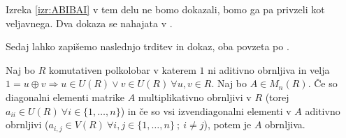 \documentclass[mat1]{fmfdelo}
\begin{document}
Izreka \ref{izr:ABIBAI} v tem delu ne bomo dokazali, bomo ga pa privzeli kot veljavnega. Dva dokaza se nahajata v \cite[poglavje 3 in poglavje 4]{bib:Reutenauer}.

Sedaj lahko zapišemo naslednjo trditev in dokaz, oba povzeta po \cite[lema 2.\ 3.]{bib:Tanbase}.

\begin{trditev}\label{trd:obrnljMatr}
	Naj bo $R$ komutativen polkolobar v katerem $1$ ni aditivno obrnljiva in velja $1 = u \oplus v \Rightarrow u\in U(R) \lor v\in U(R)~\forall u, v \in R$. Naj bo $A\in M_n(R)$. Če so diagonalni elementi matrike $A$ multiplikativno obrnljivi v $R$ (torej $a_{ii}\in U(R)~\forall i \in \{1, \ldots, n\}$) in če so vsi izvendiagonalni elementi v $A$ aditivno obrnljivi ($a_{i,j}\in V(R)~\forall i, j\in \{1, \ldots, n\} ~;~i\neq j$), potem je $A$ obrnljiva.
\end{trditev}
\end{document}
